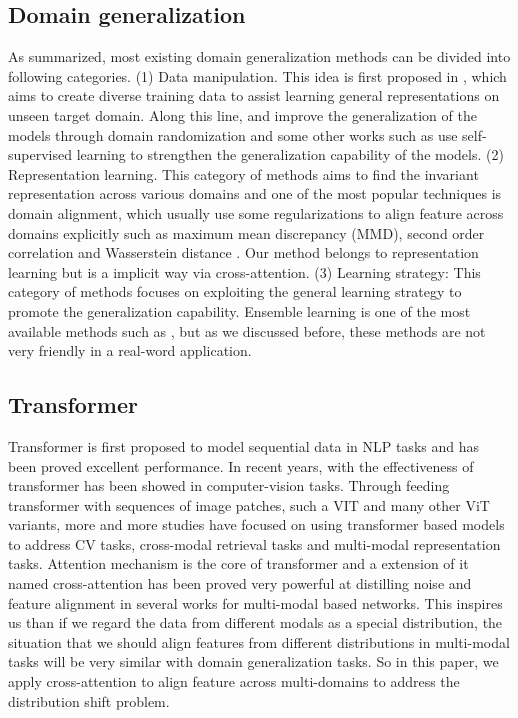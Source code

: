 \documentclass{article}
\begin{document}
\subsection{Domain generalization}
As \cite{wang2021generalizing} summarized, most existing domain generalization methods can be divided into following categories.
(1) Data manipulation. This idea is first proposed in \cite{tobin2017domain}, which aims to create diverse training data to assist learning general representations on unseen target domain.  Along this line, \cite{peng2018sim} and \cite{tremblay2018training} improve the generalization of the models through domain randomization and some other works such as \cite{kim2021selfreg} use self-supervised learning to  strengthen the generalization capability of the models.
(2) Representation learning. This category of methods aims to find the invariant representation across various domains and one of the most popular techniques is domain alignment, which usually use some  regularizations to align feature across domains explicitly such as maximum mean discrepancy \cite{pan2010domain} (MMD), second order correlation \cite{sun2016return} and Wasserstein distance \cite{zhou2020domain}. Our method belongs to representation learning but is a implicit way via cross-attention.
(3) Learning strategy: This category of methods focuses on exploiting the general learning strategy to promote the generalization capability. Ensemble learning is one of the most available methods such as \cite{cha2021swad}\cite{arpit2021ensemble}, but as we discussed before, these methods are not very friendly in a real-word application.

\subsection{Transformer}
Transformer\cite{vaswani2017attention} is first proposed to model sequential data in NLP tasks and has been proved excellent performance. In recent years, with the effectiveness of transformer has been showed in  computer-vision tasks\cite{han2020survey}. Through feeding transformer with sequences of image patches, such a VIT\cite{dosovitskiy2020image} and many other ViT variants\cite{yuan2021tokens}\cite{liu2021swin}, more and more studies have focused on using transformer based models to address CV tasks, cross-modal retrieval tasks and multi-modal representation tasks. Attention mechanism is the core of transformer and a extension of it named cross-attention has been proved very powerful at distilling noise and feature alignment in several works\cite{hu2021unit}\cite{tsai2019multimodal} for multi-modal based networks. This inspires us than if we regard the data from different modals as a special distribution, the situation that we should align features from different distributions in multi-modal tasks will be very similar with domain generalization tasks. So in this paper, we apply cross-attention to align feature across multi-domains to address the distribution shift problem.
\end{document}
